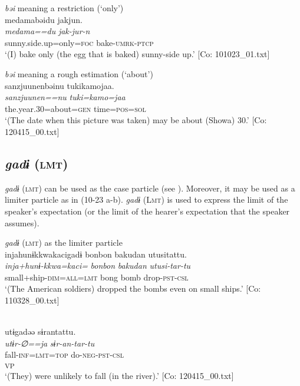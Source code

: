 \ea\label{ex:10.22} 
 \ea\textit{bəi} meaning a restriction (‘only’)\\
      \glll    {\textbar}medama{\textbar}bəidu  jakjun.\\
      \textit{medama==du}  \textit{jak-jur-n}\\
      sunny.side.up=only=\textsc{foc}  bake-\textsc{umrk}-\textsc{ptcp}\\
      \glt       ‘(I) bake only (the egg that is baked) sunny-side up.’ [Co: 101023\_01.txt]

  \ex  \textit{bəi} meaning a rough estimation (‘about’)\\
      \glll    {\textbar}sanzjuunen{\textbar}bəinu  tukikamojaa.\\
      \textit{sanzjuunen==nu}  \textit{tuki=kamo=jaa}\\
      the.year.30=about=\textsc{gen}  time=\textsc{pos}=\textsc{sol}\\
      \glt       ‘(The date when this picture was taken) may be about (Showa) 30.’ [Co: 120415\_00.txt]
    \z
\z

\subsection{\textit{gadɨ} (\textsc{lmt})}\label{sec:10.1.5}

\textit{gadɨ} (\textsc{lmt}) can be used as the case particle (see ). Moreover, it may be used as a limiter particle as in (10-23 a-b). \textit{gadɨ} (L\textsc{mt}) is used to express the limit of the speaker’s expectation (or the limit of the hearer’s expectation that the speaker assumes).

\ea\label{ex:10.23}   \textit{gadɨ} (\textsc{lmt}) as the limiter particle\\
    \ea%
      \glll    injahunɨkkwakacigadɨ  {\textbar}bonbon  bakudan  utusi{\textbar}tattu.\\
      \textit{inja+hunɨ-kkwa=kaci=}  \textit{bonbon}  \textit{bakudan}  \textit{utusi-tar-tu}\\
      small+ship-\textsc{dim}=\textsc{all}=\textsc{lmt}  bong  bomb  drop-\textsc{pst}-\textsc{csl}\\
      \glt       ‘(The American soldiers) dropped the bombs even on small ships.’ [Co: 110328\_00.txt]

  \ex{}\\
      \gllll    utɨgadəə  sɨrantattu.\\
      \textit{utɨr-∅==ja}  \textit{sɨr-an-tar-tu}\\
      fall-\textsc{inf}=\textsc{lmt}=\textsc{top}  do-\textsc{neg}-\textsc{pst}-\textsc{csl}\\
      [Complement  \textsc{lv}]\textsubscript{VP}\\
      \glt ‘(They) were unlikely to fall (in the river).’    [Co: 120415\_00.txt]
    \z
\z

